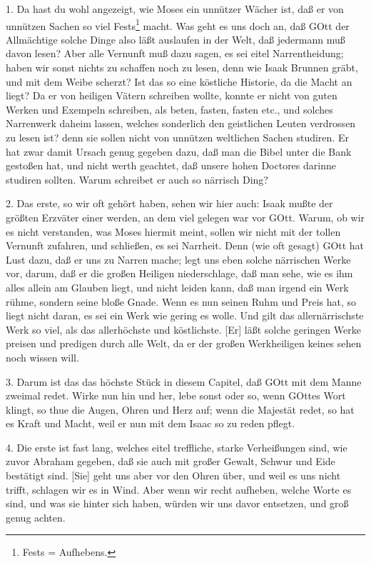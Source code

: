 1. Da hast du wohl angezeigt, wie Moses ein unnützer Wächer ist, daß er von unnützen Sachen so viel Fests\footnote{Fests = Aufhebens.} macht. Was geht es uns doch an, daß GOtt der Allmächtige solche Dinge also läßt auslaufen in der Welt, daß jedermann muß davon lesen? Aber alle Vernunft muß dazu sagen, es sei eitel Narrentheidung; haben wir sonst nichts zu schaffen noch zu lesen, denn wie Isaak Brunnen gräbt, und mit dem Weibe scherzt? Ist das so eine köstliche Historie, da die Macht an liegt? Da er von heiligen Vätern schreiben wollte, konnte er nicht von guten Werken und Exempeln schreiben, als beten, fasten, fasten etc., und solches Narrenwerk daheim lassen, welches sonderlich den geistlichen Leuten verdrossen zu lesen ist? denn sie sollen nicht von unnützen weltlichen Sachen studiren. Er hat zwar damit Ursach genug gegeben dazu, daß man die Bibel unter die Bank gestoßen hat, und nicht werth geachtet, daß unsere hohen Doctores darinne studiren sollten. Warum schreibet er auch so närrisch Ding?

2. Das erste, so wir oft gehört haben, sehen wir hier auch: Isaak mußte der größten Erzväter einer werden, an dem viel gelegen war vor GOtt. Warum, ob wir es nicht verstanden, was Moses hiermit meint, sollen wir nicht mit der tollen Vernunft zufahren, und schließen, es sei Narrheit. Denn (wie oft gesagt) GOtt hat
Lust dazu, daß er uns zu Narren mache; legt uns eben solche närrischen Werke vor, darum, daß er die großen Heiligen niederschlage, daß man sehe, wie es ihm alles allein am Glauben liegt, und nicht leiden kann, daß man irgend ein Werk rühme, sondern seine bloße Gnade. Wenn es nun seinen Ruhm und Preis hat, so liegt nicht daran, es sei ein Werk wie gering es wolle. Und gilt das allernärrischste Werk so viel, als das allerhöchste und köstlichste. [Er] läßt solche geringen Werke preisen und predigen durch alle Welt, da er der großen Werkheiligen keines sehen noch wissen will.

3. Darum ist das das höchste Stück in diesem Capitel, daß GOtt mit dem Manne zweimal redet. Wirke nun hin und her, lebe sonst oder so, wenn GOttes Wort klingt, so thue die Augen, Ohren und Herz auf; wenn die Majestät redet, so hat es Kraft und Macht, weil er nun mit dem Isaac so zu reden pflegt.

4. Die erste ist fast lang, welches eitel treffliche, starke Verheißungen sind, wie zuvor Abraham gegeben, daß sie auch mit großer Gewalt, Schwur und Eide bestätigt sind. [Sie] geht uns aber vor den Ohren über, und weil es uns nicht trifft, schlagen wir es in Wind. Aber wenn wir recht aufheben, welche Worte es sind, und was sie hinter sich haben, würden wir uns davor entsetzen, und groß genug achten.

